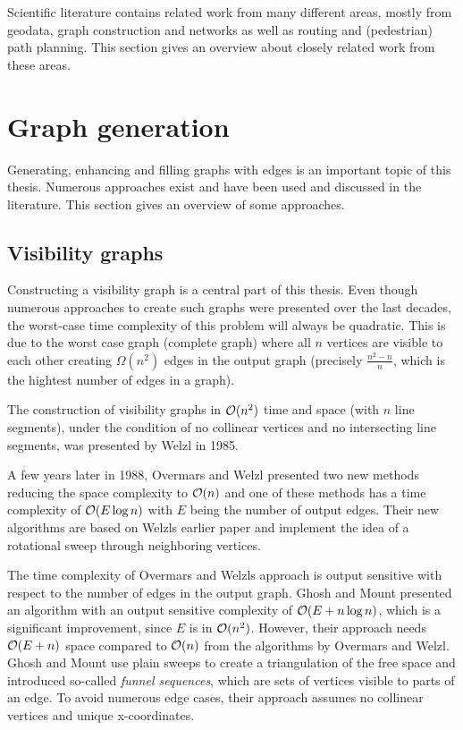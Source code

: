 
Scientific literature contains related work from many different areas, mostly from geodata, graph construction and networks as well as routing and (pedestrian) path planning.
This section gives an overview about closely related work from these areas.

\section{Graph generation}
\label{sec:graph-generation}

	Generating, enhancing and filling graphs with edges is an important topic of this thesis.
	Numerous approaches exist and have been used and discussed in the literature.
	This section gives an overview of some approaches.

	\subsection{Visibility graphs}
	\label{subsec:related-work:visibility-graph}

		Constructing a visibility graph is a central part of this thesis.
		Even though numerous approaches to create such graphs were presented over the last decades, the worst-case time complexity of this problem will always be quadratic.
		This is due to the worst case graph (complete graph) where all $n$ vertices are visible to each other creating $\Omega(n^2)$ edges in the output graph (precisely $\frac{n^2-n}{n}$, which is the hightest number of edges in a graph).
		
		The construction of visibility graphs in $\mathcal{O}(n^2)$ time and space (with $n$ line segments), under the condition of no collinear vertices and no intersecting line segments, was presented by Welzl in 1985\cite{welzl-visibility-graph}.
		
		A few years later in 1988, Overmars and Welzl presented two new methods reducing the space complexity to $\mathcal{O}(n)$\cite{overmars-weizl-visibility-graph} and one of these methods has a time complexity of $\mathcal{O}(E \log n)$ with $E$ being the number of output edges.
		Their new algorithms are based on Welzls earlier paper and implement the idea of a rotational sweep through neighboring vertices.
		
		The time complexity of Overmars and Welzls approach is output sensitive with respect to the number of edges in the output graph\cite{ghosh-output-sensitive-vgraph}.
		Ghosh and Mount presented an algorithm with an output sensitive complexity of $\mathcal{O}(E + n \log n)$, which is a significant improvement, since $E$ is in $\mathcal{O}(n^2)$.
		However, their approach needs $\mathcal{O}(E + n)$ space compared to $\mathcal{O}(n)$ from the algorithms by Overmars and Welzl.
		Ghosh and Mount use plain sweeps to create a triangulation of the free space and introduced so-called \emph{funnel sequences}, which are sets of vertices visible to parts of an edge.
		To avoid numerous edge cases, their approach assumes no collinear vertices and unique x-coordinates.
		
